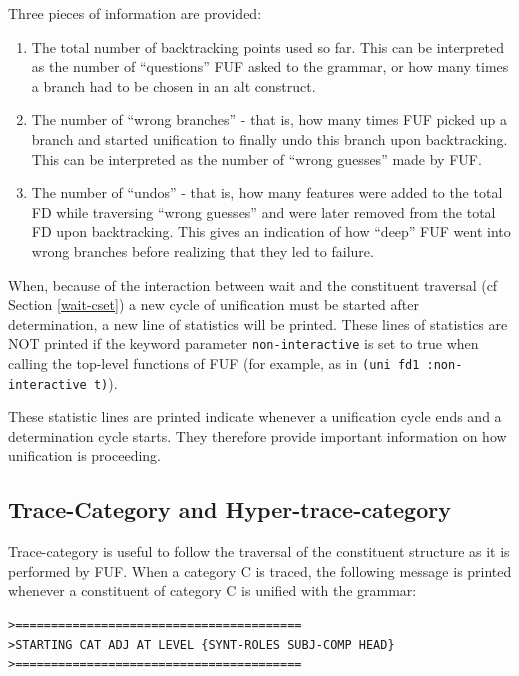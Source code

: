 \documentclass[10pt,a4paper]{report}
\begin{document}
Three pieces of information are provided: 
\begin{enumerate}
\item The total number of backtracking points used so far.  This can be
interpreted as the number of ``questions'' FUF asked to the grammar, or how
many times a branch had to be chosen in an alt construct.

\item The number of ``wrong branches'' - that is, how many times FUF picked up a
branch and started unification to finally undo this branch upon
backtracking.  This can be interpreted as the number of ``wrong guesses''
made by FUF.  

\item The number of ``undos'' - that is, how many features were added to the
total FD while traversing ``wrong guesses'' and were later removed from the
total FD upon backtracking.  This gives an indication of how ``deep'' FUF
went into wrong branches before realizing that they led to failure.
\end{enumerate}

When, because of the interaction between wait and the constituent traversal
(cf Section \ref{wait-cset}) a new cycle of unification must be started
after determination, a new line of statistics will be printed.  
These lines of statistics are NOT printed if the keyword parameter
{\tt non-interactive} is set to true when calling the top-level functions of
FUF (for example, as in {\tt (uni fd1 :non-interactive t)}).

These statistic lines are printed indicate whenever a unification cycle
ends and a determination cycle starts.  They therefore provide important
information on how unification is proceeding.


\subsection{Trace-Category and Hyper-trace-category}

Trace-category is useful to follow the traversal of the constituent
structure as it is performed by FUF. When a category C is traced, the
following message is printed whenever a constituent of category C is
unified with the grammar: 

\begin{lstlisting}[language=Lisp]
>========================================
>STARTING CAT ADJ AT LEVEL {SYNT-ROLES SUBJ-COMP HEAD}
>========================================

\end{lstlisting}
\end{document}
